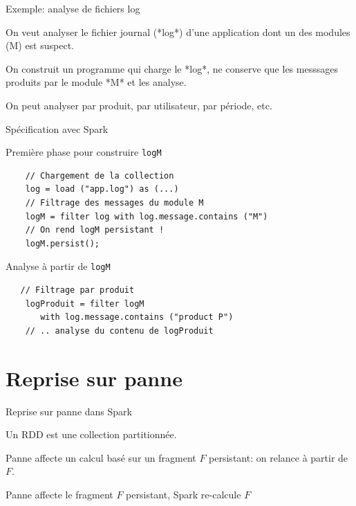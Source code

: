 \begin{frame}{Exemple: analyse de fichiers log}
 
On veut analyser le fichier journal (*log*) d'une application dont un des modules (M) est suspect.

\vfill

On construit  un programme qui charge le  *log*, ne conserve
que les messsages produits par le module *M* et les analyse.

\vfill

On peut analyser par produit, par utilisateur, par période, etc.


\vfill


\end{frame}


\begin{frame}[fragile]{Spécification avec Spark}

Première phase pour construire \texttt{logM}

\begin{verbatim}
    // Chargement de la collection
    log = load ("app.log") as (...)
    // Filtrage des messages du module M
    logM = filter log with log.message.contains ("M")    
    // On rend logM persistant !
    logM.persist();
\end{verbatim}

\vfill

Analyse à partir de \texttt{logM}

\begin{verbatim}
   // Filtrage par produit
    logProduit = filter logM 
       with log.message.contains ("product P")   
    // .. analyse du contenu de logProduit     
\end{verbatim}

\end{frame}

\section{Reprise sur panne}

\begin{frame}{Reprise sur panne dans Spark}

Un RDD est une collection \alert{partitionnée}.

\vfill


\vfill

\begin{blocgauche}
Panne affecte un calcul basé sur un fragment $F$  persistant:  on relance à partir de $F$.

\medskip

Panne  affecte le fragment $F$  persistant, Spark re-calcule $F$
\end{blocgauche}
\end{frame}

